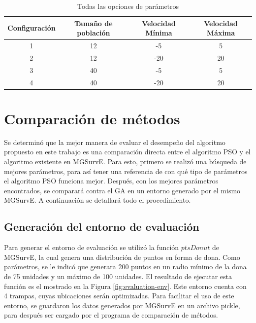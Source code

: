   \begin{table}[ht!]
    \caption{Todas las opciones de parámetros}
    \begin{center}
      \begin{tabular}{|c|c|c|c|}
        \hline
        Configuración & Tamaño de población & Velocidad Mínima & Velocidad Máxima \\
        \hline
        1 & 12 & -5 & 5 \\
        \hline
        2 & 12 & -20 & 20 \\
        \hline
        3 & 40 & -5 & 5 \\
        \hline
        4 & 40 & -20 & 20 \\
        \hline
      \end{tabular}
      \label{table:params-options}
    \end{center}
  \end{table}

\section{Comparación de métodos}
  
  Se determinó que la mejor manera de evaluar el desempeño del algoritmo
  propuesto en este trabajo es una comparación directa entre el algoritmo PSO 
  y el algoritmo existente en MGSurvE. Para esto, primero se realizó una
  búsqueda de mejores parámetros, para así tener una referencia de con qué
  tipo de parámetros el algoritmo PSO funciona mejor. Después, con los mejores
  parámetros encontrados, se comparará contra el GA en un entorno generado por
  el mismo MGSurvE. A continuación se detallará todo el procedimiento. 

  \subsection{Generación del entorno de evaluación}

  Para generar el entorno de evaluación se utilizó la función $ptsDonut$ de
  MGSurvE, la cual genera una distribución de puntos en forma de dona. Como
  parámetros, se le indicó que generara 200 puntos en un radio mínimo de la
  dona de 75 unidades y un máximo de 100 unidades. El resultado de ejecutar
  esta función es el mostrado en la Figura \ref{fig:evaluation-env}. Este
  entorno cuenta con 4 trampas, cuyas ubicaciones serán optimizadas. Para
  facilitar el uso de este entorno, se guardaron los datos generados por
  MGSurvE en un archivo pickle, para después ser cargado por el programa de
  comparación de métodos. 

